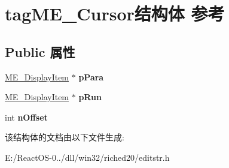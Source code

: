\hypertarget{structtag_m_e___cursor}{}\section{tag\+M\+E\+\_\+\+Cursor结构体 参考}
\label{structtag_m_e___cursor}
\subsection*{Public 属性}
\begin{DoxyCompactItemize}
\item 
\mbox{\label{structtag_m_e___cursor_a41e53e8d61b903131a4db9b34c4e69b3}} 
\hyperlink{structtag_m_e___display_item}{M\+E\+\_\+\+Display\+Item} $\ast$ {\bfseries p\+Para}
\item 
\mbox{\label{structtag_m_e___cursor_ab0f5fc0e24a19fcc3c8faca40d333893}} 
\hyperlink{structtag_m_e___display_item}{M\+E\+\_\+\+Display\+Item} $\ast$ {\bfseries p\+Run}
\item 
\mbox{\label{structtag_m_e___cursor_a492aab03faab982343231d61e8422e9a}} 
int {\bfseries n\+Offset}
\end{DoxyCompactItemize}


该结构体的文档由以下文件生成\+:\begin{DoxyCompactItemize}
\item 
E\+:/\+React\+O\+S-\/0../dll/win32/riched20/editstr.\+h\end{DoxyCompactItemize}
